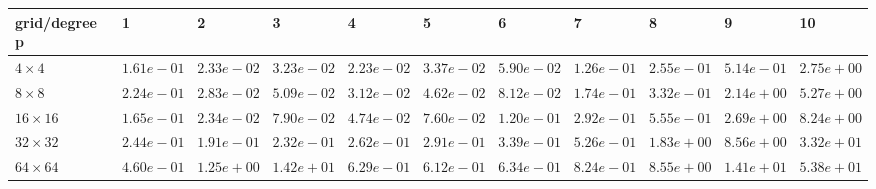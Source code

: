 \begin{tabular}{lllllllllll}
\hline
 grid/degree p   & 1          & 2          & 3          & 4          & 5          & 6          & 7          & 8          & 9          & 10         \\
\hline
 $4 \times 4$    & $1.61e-01$ & $2.33e-02$ & $3.23e-02$ & $2.23e-02$ & $3.37e-02$ & $5.90e-02$ & $1.26e-01$ & $2.55e-01$ & $5.14e-01$ & $2.75e+00$ \\
 $8 \times 8$    & $2.24e-01$ & $2.83e-02$ & $5.09e-02$ & $3.12e-02$ & $4.62e-02$ & $8.12e-02$ & $1.74e-01$ & $3.32e-01$ & $2.14e+00$ & $5.27e+00$ \\
 $16 \times 16$  & $1.65e-01$ & $2.34e-02$ & $7.90e-02$ & $4.74e-02$ & $7.60e-02$ & $1.20e-01$ & $2.92e-01$ & $5.55e-01$ & $2.69e+00$ & $8.24e+00$ \\
 $32 \times 32$  & $2.44e-01$ & $1.91e-01$ & $2.32e-01$ & $2.62e-01$ & $2.91e-01$ & $3.39e-01$ & $5.26e-01$ & $1.83e+00$ & $8.56e+00$ & $3.32e+01$ \\
 $64 \times 64$  & $4.60e-01$ & $1.25e+00$ & $1.42e+01$ & $6.29e-01$ & $6.12e-01$ & $6.34e-01$ & $8.24e-01$ & $8.55e+00$ & $1.41e+01$ & $5.38e+01$ \\
\hline
\end{tabular}